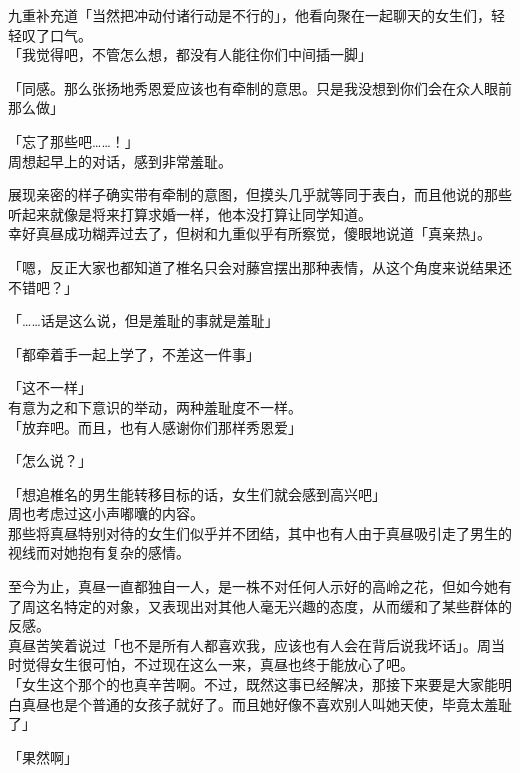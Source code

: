 九重补充道「当然把冲动付诸行动是不行的」，他看向聚在一起聊天的女生们，轻轻叹了口气。\\

「我觉得吧，不管怎么想，都没有人能往你们中间插一脚」

「同感。那么张扬地秀恩爱应该也有牵制的意思。只是我没想到你们会在众人眼前那么做」

「忘了那些吧……！」\\

周想起早上的对话，感到非常羞耻。

展现亲密的样子确实带有牵制的意图，但摸头几乎就等同于表白，而且他说的那些听起来就像是将来打算求婚一样，他本没打算让同学知道。\\

幸好真昼成功糊弄过去了，但树和九重似乎有所察觉，傻眼地说道「真亲热」。

「嗯，反正大家也都知道了椎名只会对藤宫摆出那种表情，从这个角度来说结果还不错吧？」

「……话是这么说，但是羞耻的事就是羞耻」

「都牵着手一起上学了，不差这一件事」

「这不一样」\\

有意为之和下意识的举动，两种羞耻度不一样。\\

「放弃吧。而且，也有人感谢你们那样秀恩爱」

「怎么说？」

「想追椎名的男生能转移目标的话，女生们就会感到高兴吧」\\

周也考虑过这小声嘟囔的内容。\\

那些将真昼特别对待的女生们似乎并不团结，其中也有人由于真昼吸引走了男生的视线而对她抱有复杂的感情。

至今为止，真昼一直都独自一人，是一株不对任何人示好的高岭之花，但如今她有了周这名特定的对象，又表现出对其他人毫无兴趣的态度，从而缓和了某些群体的反感。\\

真昼苦笑着说过「也不是所有人都喜欢我，应该也有人会在背后说我坏话」。周当时觉得女生很可怕，不过现在这么一来，真昼也终于能放心了吧。\\

「女生这个那个的也真辛苦啊。不过，既然这事已经解决，那接下来要是大家能明白真昼也是个普通的女孩子就好了。而且她好像不喜欢别人叫她天使，毕竟太羞耻了」

「果然啊」

